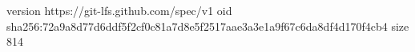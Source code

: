 version https://git-lfs.github.com/spec/v1
oid sha256:72a9a8d77d6ddf5f2cf0c81a7d8e5f2517aae3a3e1a9f67c6da8df4d170f4cb4
size 814
